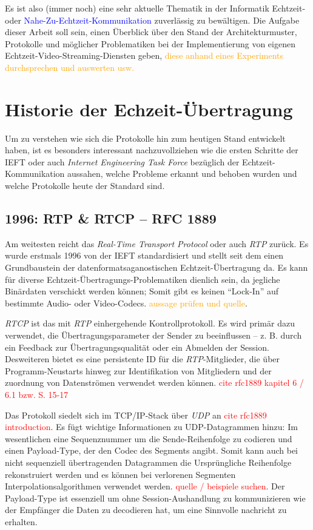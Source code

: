 \documentclass[journal]{IEEEtran}
\begin{document}
Es ist also (immer noch) eine sehr aktuelle Thematik in der Informatik
Echtzeit- oder \textcolor{blue}{Nahe-Zu-Echtzeit-Kommunikation} zuverlässig zu
bewältigen. Die Aufgabe dieser Arbeit soll sein, einen Überblick über den
Stand der Architekturmuster, Protokolle und möglicher Problematiken bei der
Implementierung von eigenen Echtzeit-Video-Streaming-Diensten geben,
\textcolor{orange}{diese anhand eines Experiments durchsprechen und auswerten
usw.}

\section{Historie der Echzeit-Übertragung}

Um zu verstehen wie sich die Protokolle hin zum heutigen Stand entwickelt
haben, ist es besonders interessant nachzuvollziehen wie die ersten Schritte
der IEFT oder auch \textit{Internet Engineering Task Force} bezüglich der
Echtzeit-Kommunikation aussahen, welche Probleme erkannt und behoben wurden und
welche Protokolle heute der Standard sind.

\subsection{1996: RTP \& RTCP – RFC 1889}

Am weitesten reicht das \textit{Real-Time Transport Protocol} oder auch
\textit{RTP} zurück. Es wurde erstmals 1996 von der IEFT standardisiert und
stellt seit dem einen Grundbaustein der datenformatsaganostischen
Echtzeit-Übertragung da. Es kann für diverse
Echtzeit-Übertragungs-Problematiken dienlich sein, da jegliche Binärdaten
verschickt werden können; Somit gibt es keinen ``Lock-In'' auf bestimmte Audio-
oder Video-Codecs. \textcolor{orange}{aussage prüfen und quelle}.

\textit{RTCP} ist das mit \textit{RTP} einhergehende Kontrollprotokoll. Es
wird primär dazu verwendet, die Übertragungsparameter der Sender zu
beeinflussen – z. B. durch ein Feedback zur Übertragungsqualität oder ein
Abmelden der Session. Desweiteren bietet es eine persistente ID für die
\textit{RTP}-Mitglieder, die über Programm-Neustarts hinweg zur Identifikation
von Mitgliedern und der zuordnung von Datenströmen verwendet werden können.
\textcolor{red}{cite rfc1889 kapitel 6 / 6.1 bzw. S. 15-17}

Das Protokoll siedelt sich im TCP/IP-Stack über \textit{UDP} an
\textcolor{red}{cite rfc1889 introduction}. Es fügt wichtige Informationen zu
UDP-Datagrammen hinzu: Im wesentlichen eine Sequenznummer um die
Sende-Reihenfolge zu codieren und einen Payload-Type, der den Codec des
Segments angibt. Somit kann auch bei nicht sequenziell übertragenden
Datagrammen die Ursprüngliche Reihenfolge rekonstruiert werden und es können
bei verlorenen Segmenten Interpolationsalgorithmen verwendet werden.
\textcolor{red}{quelle / beispiele suchen}. Der Payload-Type ist essenziell um
ohne Session-Aushandlung zu kommunizieren wie der Empfänger die Daten zu
decodieren hat, um eine Sinnvolle nachricht zu erhalten.
\end{document}
